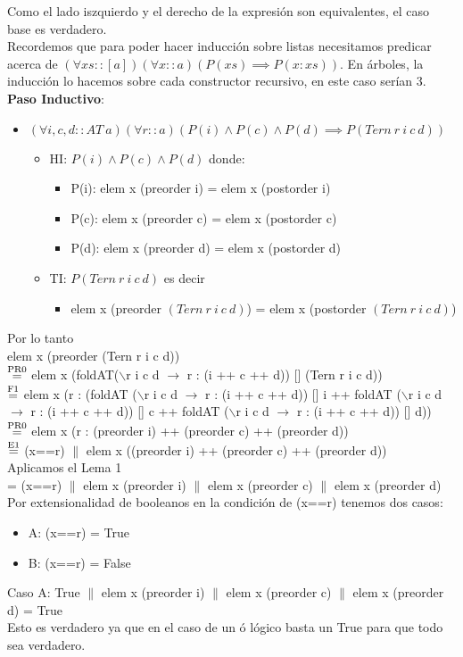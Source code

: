 \documentclass{article}
\begin{document}
Como el lado iszquierdo y el derecho de la expresión son equivalentes, el caso base es verdadero. \\
Recordemos que para poder hacer inducción sobre listas necesitamos predicar acerca de $(\forall xs::[a])(\forall x ::a) (P(xs) \implies P(x:xs))$. En árboles, la inducción lo hacemos sobre cada constructor recursivo, en este caso serían 3. \\
\textbf{Paso Inductivo}: 
\begin{itemize}
    \item $(\forall i, c, d:: AT \ a)(\forall r::a)(P(i) \land P(c) \land P(d) \implies P(Tern \ r \ i \ c \ d))$
    \begin{itemize}
        \item HI: $P(i) \land P(c) \land P(d)$ donde: 
        \begin{itemize}
            \item P(i): elem x (preorder i) = elem x (postorder i)
            \item P(c): elem x (preorder c) = elem x (postorder c)
            \item P(d): elem x (preorder d) = elem x (postorder d)
        \end{itemize}
        \item TI: $P(Tern \ r \ i \ c \ d)$ es decir
        \begin{itemize}
        \item elem x (preorder $(Tern \ r \ i \ c \ d)$) = elem x (postorder $(Tern \ r \ i \ c \ d)$)
        \end{itemize}
    \end{itemize}
\end{itemize}
Por lo tanto \\ 
elem x (preorder (Tern r i c d)) \\ 
$\stackrel{\text{PR0}}{=}$ elem x (foldAT($\backslash$r i c d $\rightarrow$ r : (i ++ c ++ d)) [] (Tern r i c d)) \\ 
$\stackrel{\text{F1}}{=}$ elem x (r : (foldAT ($\backslash$r i c d $\rightarrow$ r : (i ++ c ++ d)) [] i ++ foldAT ($\backslash$r i c d $\rightarrow$ r : (i ++ c ++ d)) [] c ++ foldAT ($\backslash$r i c d $\rightarrow$ r : (i ++ c ++ d)) [] d)) \\ 
$\stackrel{\text{PR0}}{=}$ elem x (r : (preorder i) ++ (preorder c) ++ (preorder d)) \\
$\stackrel{\text{E1}}{=}$ (x==r) $\|$ elem x ((preorder i) ++ (preorder c) ++ (preorder d)) \\
Aplicamos el Lema 1 \\
= (x==r) $\|$ elem x (preorder i) $\|$ elem x (preorder c) $\|$ elem x (preorder d) \\
Por extensionalidad de booleanos en la condición de (x==r) tenemos dos casos:
\begin{itemize}
\item A: (x==r) = True 
\item B: (x==r) = False
\end{itemize}
Caso A: True $\|$ elem x (preorder i) $\|$ elem x (preorder c) $\|$ elem x (preorder d) = True \\
Esto es verdadero ya que en el caso de un ó lógico basta un True para que todo sea verdadero.  \\  
\end{document}
